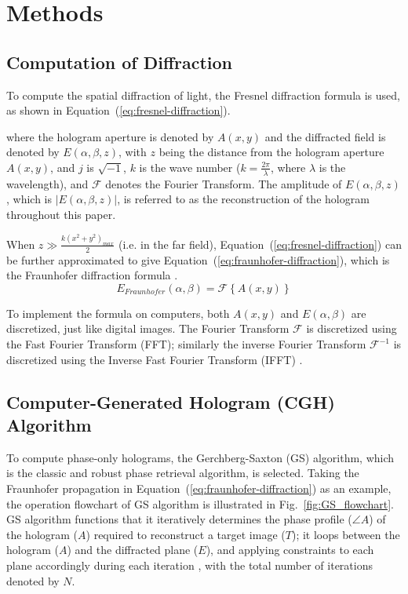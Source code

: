 \section{Methods}
\subsection{Computation of Diffraction}
	To compute the spatial diffraction of light, the Fresnel diffraction formula is used, as shown in Equation~(\ref{eq:fresnel-diffraction}).


	where the hologram aperture is denoted by $A(x, y)$ and the diffracted field is denoted by $E(\alpha, \beta, z)$, with $z$ being the distance from the hologram aperture $A(x, y)$, and $j$ is $\sqrt{-1}$, $k$ is the wave number ($k=\frac{2\pi}{\lambda}$, where $\lambda$ is the wavelength), and $\mathcal{F}$ denotes the Fourier Transform. The amplitude of $E(\alpha, \beta, z)$, which is $|E(\alpha, \beta, z)|$, is referred to as the reconstruction of the hologram throughout this paper.

	When $z\gg \frac{k(x^2+y^2)_{max}}{2}$ (i.e. in the far field), Equation~(\ref{eq:fresnel-diffraction}) can be further approximated to give Equation~(\ref{eq:fraunhofer-diffraction}), which is the Fraunhofer diffraction formula \cite{Goodman2017}.
	\begin{equation}
	  E_{Fraunhofer}(\alpha, \beta) = \mathcal{F} \left\{A(x,y)\right\}
	  \label{eq:fraunhofer-diffraction}
	\end{equation}

	To implement the formula on computers, both $A(x, y)$ and $E(\alpha, \beta)$ are discretized, just like digital images. The Fourier Transform $\mathcal{F}$ is discretized using the Fast Fourier Transform (FFT); similarly the inverse Fourier Transform $\mathcal{F}^{-1}$ is discretized using the Inverse Fast Fourier Transform (IFFT) \cite{Cochran1967}.


\subsection{Computer-Generated Hologram (CGH) Algorithm}
	To compute phase-only holograms, the Gerchberg-Saxton (GS) \cite{Gerchberg1972} algorithm, which is the classic and robust phase retrieval algorithm, is selected. Taking the Fraunhofer propagation in Equation~(\ref{eq:fraunhofer-diffraction}) as an example, the operation flowchart of GS algorithm is illustrated in Fig.~\ref{fig:GS_flowchart}. GS algorithm functions that it iteratively determines the phase profile ($\angle A$) of the hologram ($A$) required to reconstruct a target image ($T$); it loops between the hologram ($A$) and the diffracted plane ($E$), and applying constraints to each plane accordingly during each iteration \cite{Gerchberg1972}, with the total number of iterations denoted by $N$.

